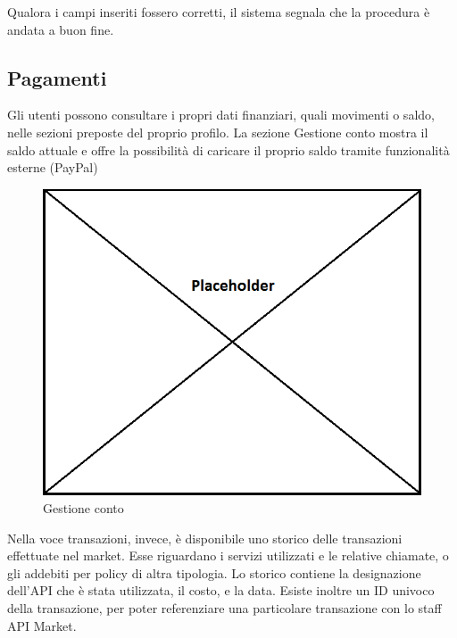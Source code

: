 Qualora i campi inseriti fossero corretti, il sistema segnala che la procedura è andata a buon fine.

\subsection{Pagamenti}

Gli utenti possono consultare i propri dati finanziari, quali movimenti o saldo, nelle sezioni preposte del proprio profilo. La sezione Gestione conto mostra il saldo attuale e offre la possibilità di caricare il proprio saldo tramite funzionalità esterne (PayPal)

\label{Gestione conto}
\begin{figure}[H]
	\centering
	\includegraphics[scale=0.45]{img/placeholder.png}
	\caption{Gestione conto}
\end{figure}

Nella voce transazioni, invece, è disponibile uno storico delle transazioni effettuate nel market. Esse riguardano i servizi utilizzati e le relative chiamate, o gli addebiti per policy di altra tipologia. Lo storico contiene la designazione dell'API che è stata utilizzata, il costo, e la data. Esiste inoltre un ID univoco della transazione, per poter referenziare una particolare transazione con lo staff API Market.